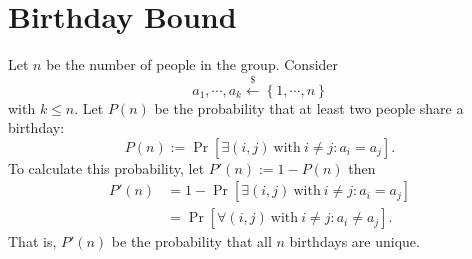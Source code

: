 \documentclass[12pt,openany]{book}
\theoremstyle{definition}
\newcommand{\set}[1]{\left\{#1\right\}}
\newcommand{\of}[1]{\left( #1 \right)}
\newcommand{\dollar}{\$}
\newcommand{\uniform}{\xleftarrow{\dollar}}
\begin{document}
	\section{Birthday Bound}
	Let $n$ be the number of people in the group. Consider \[
	a_1,\cdots,a_k\uniform\set{1,\cdots, n}
	\] with $k\leq n$. Let $P(n)$ be the probability that at least two people share a birthday: \[
	P\of{n}:=\Pr\left[\exists (i,j)\ \text{with}\ i\neq j: a_i=a_j\right].
	\] To calculate this probability, let $P'\of{n}:=1-P\of{n}$ then \begin{align*}
		P'\of{n}&=1-\Pr\left[\exists (i,j)\ \text{with}\ i\neq j: a_i=a_j\right]\\
		&=\Pr\left[\forall(i,j)\ \text{with}\ i\neq j: a_i\neq a_j\right].
	\end{align*}
	That is, $P' (n)$ be the probability that all $n$ birthdays are unique.
	
\end{document}
